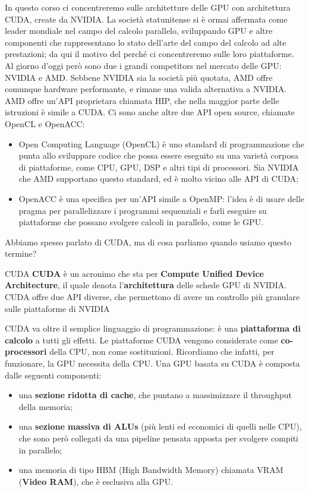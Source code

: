 In questo corso ci concentreremo sulle architetture delle GPU con architettura CUDA, create da NVIDIA. La società statunitense si è ormai affermata come leader mondiale nel campo del calcolo parallelo, sviluppando GPU e altre componenti che rappresentano lo stato dell'arte del campo del calcolo ad alte prestazioni; da qui il motivo del perché ci concentreremo sulle loro piattaforme.
\nwl
Al giorno d'oggi però sono due i grandi competitors nel mercato delle GPU: NVIDIA e AMD. Sebbene NVIDIA sia la società più quotata, AMD offre comunque hardware performante, e rimane una valida alternativa a NVIDIA. AMD offre un'API proprietara chiamata HIP, che nella maggior parte delle istruzioni è simile a CUDA. Ci sono anche altre due API open source, chiamate OpenCL e OpenACC:
\begin{itemize}
    \item Open Computing Language (OpenCL) è uno standard di programmazione che punta allo sviluppare codice che possa essere eseguito su una varietà corposa di piattaforme, come CPU, GPU, DSP e altri tipi di processori. Sia NVIDIA che AMD supportano questo standard, ed è molto vicino alle API di CUDA;
    \item OpenACC è una specifica per un'API simile a OpenMP: l'idea è di usare delle pragma per parallelizzare i programmi sequenziali e farli eseguire su piattaforme che possano svolgere calcoli in parallelo, come le GPU.
\end{itemize}

Abbiamo spesso parlato di CUDA, ma di cosa parliamo quando usiamo questo termine? 

\begin{definition}{CUDA}
    \textbf{CUDA} è un acronimo che sta per \textbf{Compute Unified Device Architecture}, il quale denota l'\textbf{architettura} delle schede GPU di NVIDIA. CUDA offre due API diverse, che permettono di avere un controllo più granulare sulle piattaforme di NVIDIA
\end{definition}

CUDA va oltre il semplice linguaggio di programmazione: è una \textbf{piattaforma di calcolo} a tutti gli effetti. Le piattaforme CUDA vengono considerate come \textbf{co-processori} della CPU, non come sostituzioni. Ricordiamo che infatti, per funzionare, la GPU necessita della CPU.
\nwl
Una GPU basata su CUDA è composta dalle seguenti componenti:
\begin{itemize}
    \item una \textbf{sezione ridotta di cache}, che puntano a massimizzare il throughput della memoria;
    \item una \textbf{sezione massiva di ALUs} (più lenti ed economici di quelli nelle CPU), che sono però collegati da una pipeline pensata apposta per svolgere compiti in parallelo;
    \item una memoria di tipo HBM (High Bandwidth Memory) chiamata VRAM (\textbf{Video RAM}), che è esclusiva alla GPU.
\end{itemize}


